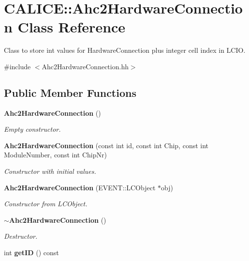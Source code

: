 \section{CALICE::Ahc2HardwareConnection Class Reference}
\label{classCALICE_1_1Ahc2HardwareConnection}


Class to store int values for HardwareConnection plus integer cell index in LCIO.  


{\ttfamily \#include $<$Ahc2HardwareConnection.hh$>$}\subsection*{Public Member Functions}
\begin{DoxyCompactItemize}
\item 
{\bf Ahc2HardwareConnection} ()\label{classCALICE_1_1Ahc2HardwareConnection_a0becd0f9301781011ab848337c3c7eab}

\begin{DoxyCompactList}\small\item\em Empty constructor. \item\end{DoxyCompactList}\item 
{\bf Ahc2HardwareConnection} (const int id, const int Chip, const int ModuleNumber, const int ChipNr)\label{classCALICE_1_1Ahc2HardwareConnection_ab19d0086bc61acb957d03a547c0ab589}

\begin{DoxyCompactList}\small\item\em Constructor with initial values. \item\end{DoxyCompactList}\item 
{\bf Ahc2HardwareConnection} (EVENT::LCObject $\ast$obj)\label{classCALICE_1_1Ahc2HardwareConnection_a9c3e5db7893f4aacf68ec17cb9aeb421}

\begin{DoxyCompactList}\small\item\em Constructor from LCObject. \item\end{DoxyCompactList}\item 
{\bf $\sim$Ahc2HardwareConnection} ()\label{classCALICE_1_1Ahc2HardwareConnection_ab77e19f41adae47a8d88d10c3b171c16}

\begin{DoxyCompactList}\small\item\em Destructor. \item\end{DoxyCompactList}\item 
int {\bf getID} () const \label{classCALICE_1_1Ahc2HardwareConnection_abe54d399d3d4e02c602deea3c224f8a5}


\end{DoxyCompactItemize}
